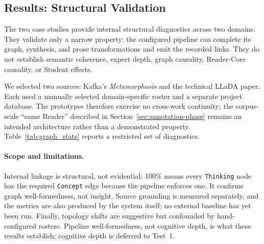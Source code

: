 \subsection{Results: Structural Validation}\label{sec:results}

The two case studies provide internal structural diagnostics across two domains.
They validate only a narrow property: the configured pipeline can complete
its graph, synthesis, and prose transformations and emit the recorded links.
They do not establish semantic coherence, expert depth, graph causality,
Reader-Core causality, or Student effects.

We selected two sources: Kafka's \emph{Metamorphosis} and the technical LLaDA
paper. Each used a manually selected domain-specific roster and a separate
project database. The prototypes therefore exercise no cross-work continuity;
the corpus-scale ``same Reader'' described in
Section~\ref{sec:annotation-phase} remains an intended architecture rather than
a demonstrated property. Table~\ref{tab:graph_stats} reports a restricted set
of diagnostics.

\paragraph{Scope and limitations.} Internal linkage is structural, not evidential:
100\% means every \texttt{Thinking} node has the required \texttt{Concept} edge because the pipeline enforces one.
It confirms graph well-formedness, not insight. Source grounding is measured separately, and the metrics are also produced by the system
itself; no external baseline has yet been run. Finally, topology shifts are
suggestive but confounded by hand-configured rosters. Pipeline well-formedness,
not cognitive depth, is what these results establish; cognitive depth is
deferred to Test~1.

